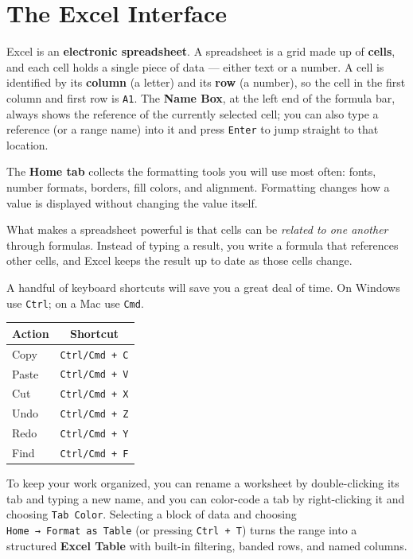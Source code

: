 \documentclass[
  11pt,
  letterpaper,
  DIV=11,
  numbers=noendperiod,
  oneside,
  open=any]{scrreprt}
\begin{document}
\section{The Excel Interface}\label{the-excel-interface}

Excel is an \textbf{electronic spreadsheet}. A spreadsheet is a grid
made up of \textbf{cells}, and each cell holds a single piece of data
--- either text or a number. A cell is identified by its \textbf{column}
(a letter) and its \textbf{row} (a number), so the cell in the first
column and first row is \texttt{A1}. The \textbf{Name Box}, at the left
end of the formula bar, always shows the reference of the currently
selected cell; you can also type a reference (or a range name) into it
and press \texttt{Enter} to jump straight to that location.

The \textbf{Home tab} collects the formatting tools you will use most
often: fonts, number formats, borders, fill colors, and alignment.
Formatting changes how a value is displayed without changing the value
itself.

What makes a spreadsheet powerful is that cells can be \emph{related to
one another} through formulas. Instead of typing a result, you write a
formula that references other cells, and Excel keeps the result up to
date as those cells change.

A handful of keyboard shortcuts will save you a great deal of time. On
Windows use \texttt{Ctrl}; on a Mac use \texttt{Cmd}.

\begin{center}
\begin{tabular}{lc}
\toprule
Action & Shortcut \\
\midrule
Copy & \texttt{Ctrl/Cmd\ +\ C} \\
Paste & \texttt{Ctrl/Cmd\ +\ V} \\
Cut & \texttt{Ctrl/Cmd\ +\ X} \\
Undo & \texttt{Ctrl/Cmd\ +\ Z} \\
Redo & \texttt{Ctrl/Cmd\ +\ Y} \\
Find & \texttt{Ctrl/Cmd\ +\ F} \\
\bottomrule
\end{tabular}
\end{center}

To keep your work organized, you can rename a worksheet by
double-clicking its tab and typing a new name, and you can color-code a
tab by right-clicking it and choosing \texttt{Tab\ Color}. Selecting a
block of data and choosing \texttt{Home\ →\ Format\ as\ Table} (or
pressing \texttt{Ctrl\ +\ T}) turns the range into a structured
\textbf{Excel Table} with built-in filtering, banded rows, and named
columns.
\end{document}
